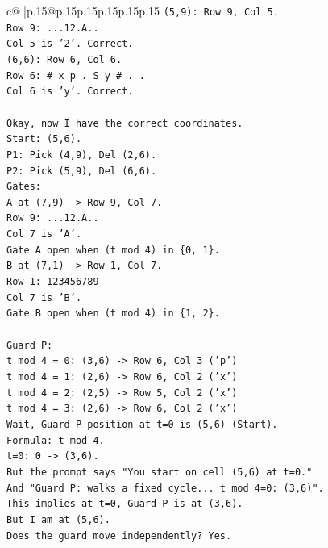 \documentclass{article}
\begin{document}
{\begin{supertabular}{c@{$\;$}|p{.15\linewidth}@{}p{.15\linewidth}p{.15\linewidth}p{.15\linewidth}p{.15\linewidth}p{.15\linewidth}}
{{{\texttt{(5,9): Row 9, Col 5.} \\
\texttt{Row 9: ...12.A..} \\
\texttt{Col 5 is '2'. Correct.} \\
\texttt{(6,6): Row 6, Col 6.} \\
\texttt{Row 6: \# x p . S y \# . .} \\
\texttt{Col 6 is 'y'. Correct.} \\
\\ 
\texttt{Okay, now I have the correct coordinates.} \\
\texttt{Start: (5,6).} \\
\texttt{P1: Pick (4,9), Del (2,6).} \\
\texttt{P2: Pick (5,9), Del (6,6).} \\
\texttt{Gates:} \\
\texttt{A at (7,9) {-}> Row 9, Col 7.} \\
\texttt{Row 9: ...12.A..} \\
\texttt{Col 7 is 'A'.} \\
\texttt{Gate A open when (t mod 4) in \{0, 1\}.} \\
\texttt{B at (7,1) {-}> Row 1, Col 7.} \\
\texttt{Row 1: 123456789} \\
\texttt{Col 7 is 'B'.} \\
\texttt{Gate B open when (t mod 4) in \{1, 2\}.} \\
\\ 
\texttt{Guard P:} \\
\texttt{t mod 4 = 0: (3,6) {-}> Row 6, Col 3 ('p')} \\
\texttt{t mod 4 = 1: (2,6) {-}> Row 6, Col 2 ('x')} \\
\texttt{t mod 4 = 2: (2,5) {-}> Row 5, Col 2 ('x')} \\
\texttt{t mod 4 = 3: (2,6) {-}> Row 6, Col 2 ('x')} \\
\texttt{Wait, Guard P position at t=0 is (5,6) (Start).} \\
\texttt{Formula: t mod 4.} \\
\texttt{t=0: 0 {-}> (3,6).} \\
\texttt{But the prompt says "You start on cell (5,6) at t=0."} \\
\texttt{And "Guard P: walks a fixed cycle... t mod 4=0: (3,6)".} \\
\texttt{This implies at t=0, Guard P is at (3,6).} \\
\texttt{But I am at (5,6).} \\
\texttt{Does the guard move independently? Yes.} \\
}}}
\end{supertabular}}
\end{document}
